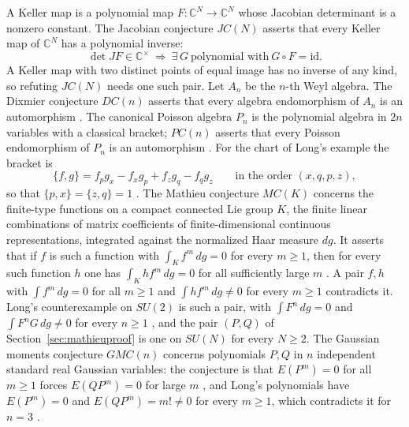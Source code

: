 \documentclass[11pt]{article}
\theoremstyle{remark}
\newcommand{\C}{\mathbb{C}}
\begin{document}
A Keller map is a polynomial map $F:\C^N\to\C^N$ whose Jacobian determinant is a nonzero constant. The Jacobian conjecture $JC(N)$ asserts that every Keller map of $\C^N$ has a polynomial inverse:
\begin{equation}\label{eq:jc}
\det JF\in\C^\times\ \Longrightarrow\ \exists\,G\ \text{polynomial with}\ G\circ F=\mathrm{id}.
\end{equation}
A Keller map with two distinct points of equal image has no inverse of any kind, so refuting $JC(N)$ needs one such pair. Let $A_n$ be the $n$-th Weyl algebra. The Dixmier conjecture $DC(n)$ asserts that every algebra endomorphism of $A_n$ is an automorphism \cite[p.~1]{BKK2007}. The canonical Poisson algebra $P_n$ is the polynomial algebra in $2n$ variables with a classical bracket; $PC(n)$ asserts that every Poisson endomorphism of $P_n$ is an automorphism \cite[abstract, p.~1]{AvdE2007}. For the chart of Long's example the bracket is
\begin{equation}\label{eq:bracket}
\{f,g\}=f_pg_x-f_xg_p+f_zg_q-f_qg_z\qquad\text{in the order }(x,q,p,z),
\end{equation}
so that $\{p,x\}=\{z,q\}=1$ \cite[Equation~(8), p.~3]{LongPoisson2026}. The Mathieu conjecture $MC(K)$ concerns the finite-type functions on a compact connected Lie group $K$, the finite linear combinations of matrix coefficients of finite-dimensional continuous representations, integrated against the normalized Haar measure $dg$. It asserts that if $f$ is such a function with $\int_Kf^m\,dg=0$ for every $m\ge1$, then for every such function $h$ one has $\int_Khf^m\,dg=0$ for all sufficiently large $m$ \cite[introduction, pp.~1--2; Definition~2.1 and Lemma~2.2, p.~3]{LongMathieu2026}. A pair $f,h$ with $\int f^m\,dg=0$ for all $m\ge1$ and $\int hf^m\,dg\ne0$ for every $m\ge1$ contradicts it. Long's counterexample on $SU(2)$ is such a pair, with $\int F^n\,dg=0$ and $\int F^nG\,dg\ne0$ for every $n\ge1$ \cite[Theorem~4.2, p.~6]{LongSU2}, and the pair $(P,Q)$ of Section~\ref{sec:mathieuproof} is one on $SU(N)$ for every $N\ge2$. The Gaussian moments conjecture $GMC(n)$ concerns polynomials $P,Q$ in $n$ independent standard real Gaussian variables: the conjecture is that $E(P^m)=0$ for all $m\ge1$ forces $E(QP^m)=0$ for large $m$ \cite[Conjecture~1.1, p.~1]{DEZ2017}, and Long's polynomials have $E(P^m)=0$ and $E(QP^m)=m!\ne0$ for every $m\ge1$, which contradicts it for $n=3$ \cite[Theorem~5.1 and Corollary~5.2, p.~6]{Long2026}.
\end{document}

